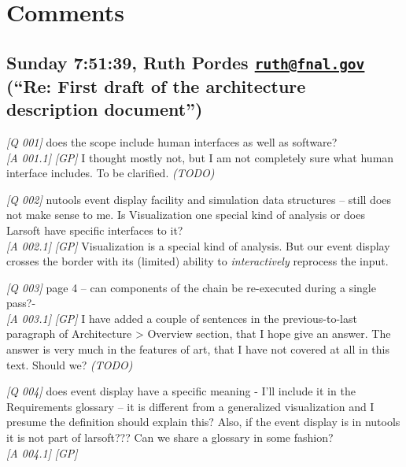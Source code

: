 \documentclass{article}
\begin{document}





\clearpage

\section*{Comments}\label{comments}

\subsection*{\texorpdfstring{Sunday 7:51:39, Ruth Pordes
\href{mailto:ruth@fnal.gov}{\nolinkurl{ruth@fnal.gov}} (``Re: First
draft of the architecture description
document'')}{Sunday 7:51:39, Ruth Pordes ruth@fnal.gov (``Re: First draft of the architecture description document'')}}\label{sunday-75139-ruth-pordes-ruthfnal.gov-re-first-draft-of-the-architecture-description-document}

\emph{{[}Q 001{]}} does the scope include human interfaces as well as
software?\\
\emph{{[}A 001.1{]}} \emph{{[}GP{]}} I thought mostly not, but I am not
completely sure what human interface includes. To be clarified.
\emph{(TODO)}

\emph{{[}Q 002{]}} nutools event display facility and simulation data
structures -- still does not make sense to me. Is Visualization one
special kind of analysis or does Larsoft have specific interfaces to
it?\\
\emph{{[}A 002.1{]}} \emph{{[}GP{]}} Visualization is a special kind of
analysis. But our event display crosses the border with its (limited)
ability to \emph{interactively} reprocess the input.

\emph{{[}Q 003{]}} page 4 -- can components of the chain be re-executed
during a single pass?-\\
\emph{{[}A 003.1{]}} \emph{{[}GP{]}} I have added a couple of sentences
in the previous-to-last paragraph of Architecture \textgreater{}
Overview section, that I hope give an answer. The answer is very much in
the features of art, that I have not covered at all in this text. Should
we? \emph{(TODO)}

\emph{{[}Q 004{]}} does event display have a specific meaning - I'll
include it in the Requirements glossary -- it is different from a
generalized visualization and I presume the definition should explain
this? Also, if the event display is in nutools it is not part of
larsoft??? Can we share a glossary in some fashion?\\
\emph{{[}A 004.1{]}} \emph{{[}GP{]}}
\end{document}
